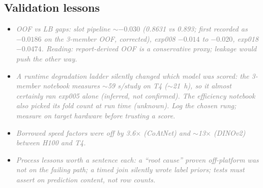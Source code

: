 \documentclass[conference]{IEEEtran}
\newcommand{\nt}[1]{\textcolor{gray}{\textit{#1}}}            %
\begin{document}
\subsection{Validation lessons}
\begin{notes}
\begin{itemize}
\item \nt{OOF vs LB gaps: slot pipeline $\sim-0.030$ (0.8631 vs 0.893; first recorded as $-0.0186$ on the 3-member OOF,
corrected), exp008 $-0.014$ to $-0.020$, exp018 $-0.0474$. Reading: report-derived OOF is a conservative proxy; leakage would
push the other way.}  %
\item \nt{A runtime degradation ladder silently changed which model was scored: the 3-member notebook measures $\sim$59
s/study on T4 ($\sim$21~h), so it almost certainly ran exp005 alone (inferred, not confirmed). The efficiency notebook also
picked its fold count at run time (unknown). Log the chosen rung; measure on target hardware before trusting a score.}
\item \nt{Borrowed speed factors were off by 3.6$\times$ (CoAtNet) and $\sim$13$\times$ (DINOv2) between H100 and T4.}
\item \nt{Process lessons worth a sentence each: a ``root cause'' proven off-platform was not on the failing path; a timed join
silently wrote label priors; tests must assert on prediction content, not row counts.}  %
\end{itemize}
\end{notes}
\end{document}
